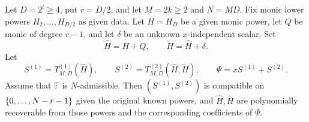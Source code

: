 \begin{lemma}
\label{lem:causal-perturbed-T}
Let $D=2^l\ge4$, put $r=D/2$, and let $M=2k\ge2$ and $N=MD$.
Fix monic lower powers $H_2,\ldots,H_{D/2}$ as given data.  Let $H=H_D$
be a given monic power, let $Q$ be monic of degree $r-1$,
and let $\delta$ be an unknown $x$-independent scalar.  Set
\[
  \widehat H=H+Q,\qquad \widetilde H=\widehat H+\delta .
\]
Let
\[
  S^{(1)}=T^{(1)}_{M,D}(\widehat H),\qquad
  S^{(2)}=T^{(2)}_{M,D}(\widehat H,\widetilde H),\qquad
  \Psi=xS^{(1)}+S^{(2)} .
\]
Assume that $\mathbb F$ is $N$-admissible.  Then
$(S^{(1)},S^{(2)})$ is compatible on $\{0,\dotsc,N-r-1\}$ given the original
known powers, and $\widehat H,\widetilde H$ are polynomially recoverable
from those powers and the corresponding coefficients of $\Psi$.
\end{lemma}
